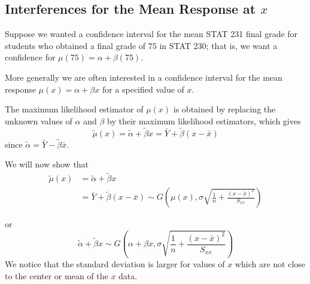 \subsection{Interferences for the Mean Response at $ x $}
Suppose we wanted a confidence interval for the mean STAT 231 final grade for students
who obtained a final grade of $ 75 $ in STAT 230; that is, we want a confidence
for $ \mu(75)=\alpha+\beta(75) $.

More generally we are often interested in a confidence interval for the mean
response $ \mu(x)=\alpha+\beta x $ for a specified value of $ x $.

The maximum likelihood estimator of $ \mu(x) $ is obtained by replacing the unknown
values of $ \alpha $ and $ \beta $ by their maximum likelihood estimators,
which gives
\[\tilde{\mu}(x)
    =\tilde{\alpha}+\tilde{\beta} x
    =\bar{Y}+\tilde{\beta}(x-\bar{x})\]
since $ \tilde{\alpha}=\bar{Y}-\tilde{\beta}\bar{x} $.

We will now show that
\[
    \begin{aligned}
        \tilde{\mu}(x)
         & =\tilde{\alpha}+\tilde{\beta}x                                      \\
         & =\bar{Y}+\tilde{\beta}\left( x-\bar{x} \right) \sim G\left( \mu(x),
        \sigma \sqrt{\frac{1}{n}+\frac{\left( x-\bar{x} \right)^2}{S_{xx}}} \right)
    \end{aligned}
\]

or
\[\tilde{\alpha}+\tilde{\beta} x \sim G\left(\alpha+\beta x,
    \sigma \sqrt{\frac{1}{n}+\frac{(x-\bar{x})^{2}}{S_{x x}}}\right)\]
We notice that the standard deviation is larger for values
of $ x $ which are not close to the center or mean of the $ x $ data.

